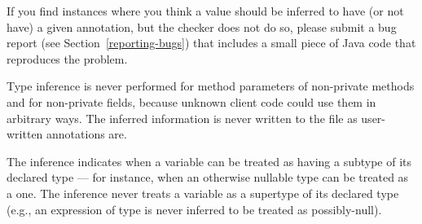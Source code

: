 If you find instances where you think a value should be inferred to have
(or not have) a
given annotation, but the checker does not do so, please submit a bug
report (see Section~\ref{reporting-bugs}) that includes a small piece of
Java code that reproduces the problem.

%
%



Type inference is never performed for method parameters of non-private
methods and for non-private fields, because unknown client code could use
them in arbitrary ways.  The inferred information is never written to the
 file as user-written annotations are.

The inference indicates when a variable can be treated as having a subtype
of its declared type --- for instance, when an otherwise nullable type can be
treated as a  one.  The inference never treats a variable as
a supertype of its declared type (e.g., an expression of 
type is never inferred to be treated as possibly-null).



